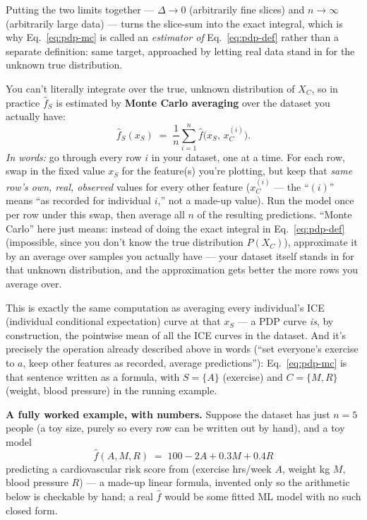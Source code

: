 Putting the two limits together --- $\Delta\to 0$ (arbitrarily fine
slices) and $n\to\infty$ (arbitrarily large data) --- turns the slice-sum
into the exact integral, which is why Eq.~\eqref{eq:pdp-mc} is called an
\emph{estimator of} Eq.~\eqref{eq:pdp-def} rather than a separate
definition: same target, approached by letting real data stand in for the
unknown true distribution.

You can't literally integrate over the true, unknown distribution of
$X_C$, so in practice $\hat f_S$ is estimated by \textbf{Monte Carlo
averaging} over the dataset you actually have:
\begin{equation}
\hat f_S(x_S) \;=\; \frac{1}{n}\sum_{i=1}^n \hat f\big(x_S,\, x_C^{(i)}\big).
\label{eq:pdp-mc}
\end{equation}
\noindent\textit{In words:} go through every row $i$ in your dataset, one
at a time. For each row, swap in the fixed value $x_S$ for the feature(s)
you're plotting, but keep that \emph{same row's own, real, observed}
values for every other feature ($x_C^{(i)}$ --- the ``$(i)$'' means ``as
recorded for individual $i$,'' not a made-up value). Run the model once
per row under this swap, then average all $n$ of the resulting
predictions. ``Monte Carlo'' here just means: instead of doing the exact
integral in Eq.~\eqref{eq:pdp-def} (impossible, since you don't know the
true distribution $P(X_C)$), approximate it by an average over samples you
actually have --- your dataset itself stands in for that unknown
distribution, and the approximation gets better the more rows you average
over.

This is exactly the same computation as averaging every individual's ICE
(individual conditional expectation) curve at that $x_S$ --- a PDP curve
\emph{is}, by construction, the pointwise mean of all the ICE curves in
the dataset. And it's precisely the operation already described above in
words (``set everyone's exercise to $a$, keep other features as
recorded, average predictions''): Eq.~\eqref{eq:pdp-mc} is that sentence
written as a formula, with $S=\{A\}$ (exercise) and $C=\{M,R\}$ (weight,
blood pressure) in the running example.

\medskip
\noindent\textbf{A fully worked example, with numbers.} Suppose the
dataset has just $n=5$ people (a toy size, purely so every row can be
written out by hand), and a toy model
$$\hat f(A,M,R) \;=\; 100 - 2A + 0.3M + 0.4R$$
predicting a cardiovascular risk score from (exercise hrs/week $A$,
weight kg $M$, blood pressure $R$) --- a made-up linear formula, invented
only so the arithmetic below is checkable by hand; a real $\hat f$ would
be some fitted ML model with no such closed form.

